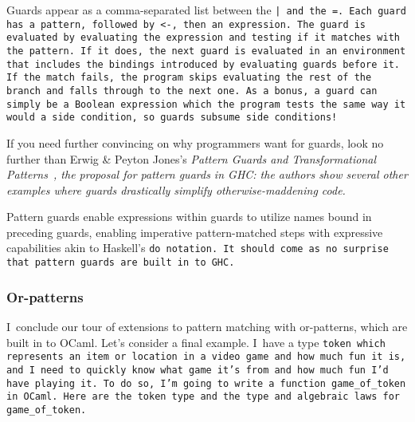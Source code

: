 \documentclass[manuscript,screen,review, 12pt, nonacm]{acmart}
\begin{document}
    Guards appear as a comma-separated list between the \tt{|} and the \tt{=}.
    Each guard has a pattern, followed by \tt{<-}, then an expression. The guard
    is evaluated by evaluating the expression and testing if it matches with the
    pattern. If it does, the next guard is evaluated in an environment that
    includes the bindings introduced by evaluating guards before it. If the
    match fails, the program skips evaluating the rest of the branch and falls
    through to the next one. As a bonus, a guard can simply be a Boolean
    expression which the program tests the same way it would a side condition,
    so guards subsume side conditions! 
    
    If you need further convincing on why programmers want for guards, look no
    further than Erwig \& Peyton Jones's \it{Pattern Guards and Transformational
    Patterns}~\citep{guardproposal}, the proposal for pattern guards in GHC: the
    authors show several other examples where guards drastically simplify
    otherwise-maddening code. 
    
    Pattern guards enable expressions within guards to utilize names bound in
    preceding guards, enabling imperative pattern-matched steps with expressive
    capabilities akin to Haskell's \tt{do} notation. It should come as no
    surprise that pattern guards are built in to GHC. \raggedbottom
\subsubsection{Or-patterns}
    I~conclude our tour of extensions to pattern matching with or-patterns,
    which are built in to OCaml. Let's consider a final example. I~have a type
    \tt{token} which represents an item or location in a video game and how much
    fun it is, and I~need to quickly know what game it's from and how much fun
    I'd have playing it. To do so, I'm going to write a function
    \tt{game\_of\_token} in OCaml. Here are the \tt{token} type and the type and
    algebraic laws for \tt{game\_of\_token}. 
  
\end{document}
